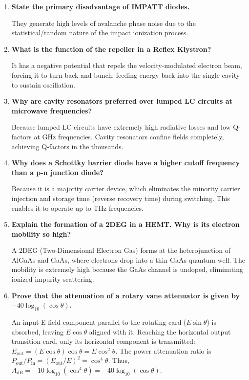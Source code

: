 \documentclass[12pt,a4paper]{article}
\newcommand{\Q}[1]{\textbf{#1}\par\noindent\ignorespaces}
\begin{document}
\begin{tcolorbox}[exambox, title={\textbf{Frequently Asked / Viva Questions}}]
\begin{enumerate}[topsep=0pt, label=\textbf{Q\arabic*.}, itemsep=5pt]
    It represents the operational state where adjacent anode cavities oscillate with a phase difference of $180^\circ$ ($\pi$ radians), which is the most stable and efficient mode.
  \item \Q{State the primary disadvantage of IMPATT diodes.}
    They generate high levels of avalanche phase noise due to the statistical/random nature of the impact ionization process.
  \item \Q{What is the function of the repeller in a Reflex Klystron?}
    It has a negative potential that repels the velocity-modulated electron beam, forcing it to turn back and bunch, feeding energy back into the single cavity to sustain oscillation.
  \item \Q{Why are cavity resonators preferred over lumped LC circuits at microwave frequencies?}
    Because lumped LC circuits have extremely high radiative losses and low Q-factors at GHz frequencies. Cavity resonators confine fields completely, achieving Q-factors in the thousands.
  \item \Q{Why does a Schottky barrier diode have a higher cutoff frequency than a p-n junction diode?}
    Because it is a majority carrier device, which eliminates the minority carrier injection and storage time (reverse recovery time) during switching. This enables it to operate up to THz frequencies.
  \item \Q{Explain the formation of a 2DEG in a HEMT. Why is its electron mobility so high?}
    A 2DEG (Two-Dimensional Electron Gas) forms at the heterojunction of AlGaAs and GaAs, where electrons drop into a thin GaAs quantum well. The mobility is extremely high because the GaAs channel is undoped, eliminating ionized impurity scattering.
  \item \Q{Prove that the attenuation of a rotary vane attenuator is given by $-40 \log_{10}(\cos\theta)$.}
    An input E-field component parallel to the rotating card ($E\sin\theta$) is absorbed, leaving $E\cos\theta$ aligned with it. Reaching the horizontal output transition card, only its horizontal component is transmitted: $E_{\text{out}} = (E\cos\theta)\cos\theta = E\cos^2\theta$. The power attenuation ratio is $P_{\text{out}}/P_{\text{in}} = (E_{\text{out}}/E)^2 = \cos^4\theta$. Thus, $A_{\text{dB}} = -10 \log_{10}(\cos^4\theta) = -40 \log_{10}(\cos\theta)$.
\end{enumerate}
\end{tcolorbox}
\end{document}
